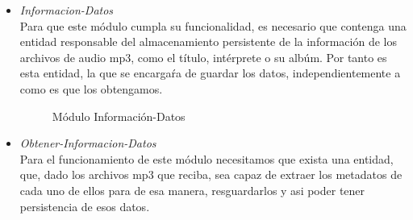 \documentclass[10pt,letterpaper]{report}
\begin{document}
\begin{itemize}
    \item  \textit{Informacion-Datos} \\
    \noindent Para que este módulo cumpla su funcionalidad, es necesario que contenga una entidad responsable del almacenamiento persistente de la información de los archivos de audio mp3, como el título, intérprete o su albúm. Por tanto es esta entidad, la que se encargaŕa de guardar los datos, independientemente a como es que los obtengamos. 

    \begin{figure}[H]
\centering


\caption{Módulo Información-Datos}
\label{fig:informacion-datos}
\end{figure}

\item  \textit{Obtener-Informacion-Datos} \\
    \noindent Para el funcionamiento de este módulo necesitamos que exista una entidad, que, dado los archivos mp3 que reciba, sea capaz de extraer los metadatos de cada uno de ellos para de esa manera, resguardarlos y asi poder tener persistencia de esos datos.

        \begin{figure}[H]
\centering



\end{figure}
\end{itemize}
\end{document}
